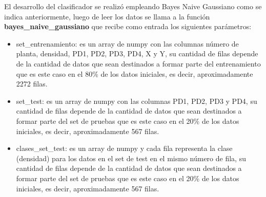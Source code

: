 El desarrollo del clasificador se realizó empleando Bayes Naive Gaussiano como se indica anteriormente, luego de leer los datos se llama a la función
\textbf{bayes\_naive\_gaussiano} que recibe como entrada los siguientes parámetros:
\begin{itemize}
	\item{set\_entrenamiento: es un array de numpy con las columnas número de planta, densidad, PD1, PD2, PD3, PD4, X y Y, su
	cantidad de filas depende de la cantidad de datos que sean destinados a formar parte del entrenamiento que es este caso en
	el 80\% de los datos iniciales, es decir, aproximadamente 2272 filas.}
	\item{set\_test: es un array de numpy con las columnas PD1, PD2, PD3 y PD4, su cantidad de filas depende de la cantidad de
	datos que sean destinados a formar parte del set de pruebas que es este caso en el 20\% de los datos iniciales, es decir,
	aproximadamente 567 filas.}
	\item{clases\_set\_test: es un array de numpy y cada fila representa la clase (densidad) para los datos en el set de test
	en el mismo número de fila, su cantidad de filas depende de la cantidad de datos que sean destinados a formar parte del set
	de pruebas que es este caso en el 20\% de los datos iniciales, es decir, aproximadamente 567 filas.}
\end{itemize}

